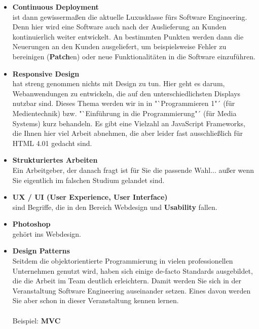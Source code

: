 \begin{itemize}
	\item \textbf{Continuous Deployment}\\
	ist dann gewissermaßen die aktuelle Luxusklasse fürs Software Engineering. Denn hier wird eine Software auch nach der Auslieferung an Kunden kontinuierlich weiter entwickelt. An bestimmten Punkten werden dann die Neuerungen an den Kunden ausgeliefert, um beispielsweise Fehler zu bereinigen (\textbf{Patch}en) oder neue Funktionalitäten in die Software einzuführen.

	\item \textbf{Responsive Design}\\
	hat streng genommen nichts mit Design zu tun. Hier geht es darum, Webanwendungen zu entwickeln, die auf den unterschiedlichsten Displays nutzbar sind. Dieses Thema werden wir in in "`Programmieren 1"´ (für Medientechnik) bzw. "`Einführung in die Programmierung"´ (für Media Systems) kurz behandeln. Es gibt eine Vielzahl an JavaScript Frameworks, die Ihnen hier viel Arbeit abnehmen, die aber leider fast ausschließlich für HTML 4.01 gedacht sind.

	\item \textbf{Strukturiertes Arbeiten}\\
	Ein Arbeitgeber, der danach fragt ist für Sie die passende Wahl... außer wenn Sie eigentlich im falschen Studium gelandet sind.

	\item \textbf{UX / UI (User Experience, User Interface)}\\
	sind Begriffe, die in den Bereich Webdesign und \textbf{Usability} fallen.

	\item \textbf{Photoshop}\\
	gehört ins Webdesign.

	\item \textbf{Design Patterns}\\
	Seitdem die objektorientierte Programmierung in vielen professionellen Unternehmen genutzt wird, haben sich einige de-facto Standards ausgebildet, die die Arbeit im Team deutlich erleichtern. Damit werden Sie sich in der Veranstaltung Software Engineering auseinander setzen. Eines davon werden Sie aber schon in dieser Veranstaltung kennen lernen.\\
	\\
	Beispiel: \textbf{MVC}


\end{itemize}
